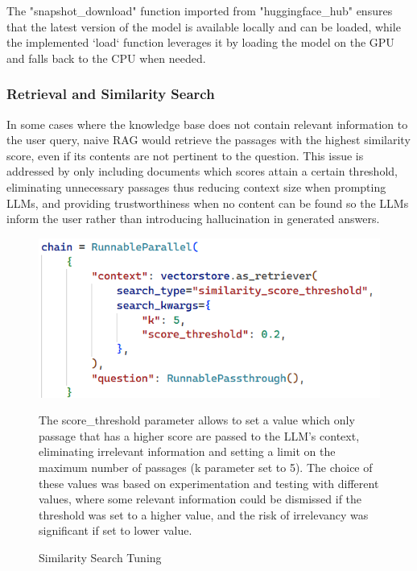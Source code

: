 The "snapshot\_download" function imported from "huggingface\_hub" ensures that the latest version of the model is available locally and can be loaded, while the implemented `load` function leverages it by loading the model on the GPU and falls back to the CPU when needed.\newpage
\subsubsection{Retrieval and Similarity Search}
In some cases where the knowledge base does not contain relevant information to the user query, naive RAG would retrieve the passages with the highest similarity score, even if its contents are not pertinent to the question. This issue is addressed by only including documents which scores attain a certain threshold, eliminating unnecessary passages thus reducing context size when prompting LLMs, and providing trustworthiness when no content can be found so the LLMs inform the user rather than introducing hallucination in generated answers.
\begin{figure}[htbp]
    \centering
    \includegraphics[width=\linewidth]{./figures/similarity_search_threshold.png}
    \caption{Similarity Search Tuning}
    \begin{flushleft}
        \small The score\_threshold parameter allows to set a value which only passage that has a higher score are passed to the LLM's context, eliminating irrelevant information and setting a limit on the maximum number of passages (k parameter set to 5). The choice of these values was based on experimentation and testing with different values, where some relevant information could be dismissed if the threshold was set to a higher value, and the risk of irrelevancy was significant if set to lower value.
    \end{flushleft}
\end{figure}\newline

